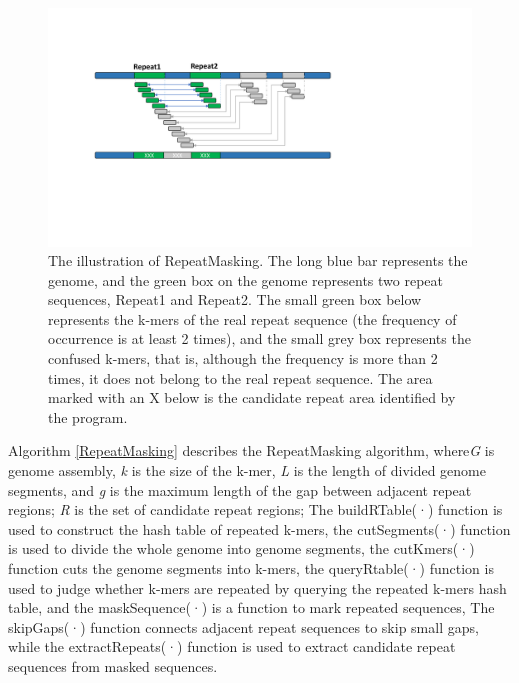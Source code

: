 \documentclass{bmcart}
\begin{document}
\begin{figure}[h!]
	\centerline{\includegraphics[width=1.0\textwidth]{figures/RepeatMasking.pdf}}
	\caption{The illustration of RepeatMasking. The long blue bar represents the genome, and the green box on the genome represents two repeat sequences, Repeat1 and Repeat2. The small green box below represents the k-mers of the real repeat sequence (the frequency of occurrence is at least 2 times), and the small grey box represents the confused k-mers, that is, although the frequency is more than 2 times, it does not belong to the real repeat sequence. The area marked with an X below is the candidate repeat area identified by the program.}
	\label{fig:repeatmasking}
\end{figure}

Algorithm \ref{RepeatMasking} describes the RepeatMasking algorithm, where\emph{G} is genome assembly, \emph{k} is the size of the k-mer, \emph{L} is the length of divided genome segments, and \emph{g} is the maximum length of the gap between adjacent repeat regions; \emph{R} is the set of candidate repeat regions; The buildRTable(·) function is used to construct the hash table of repeated k-mers, the cutSegments(·) function is used to divide the whole genome into genome segments, the cutKmers(·) function cuts the genome segments into k-mers, the queryRtable(·) function is used to judge whether k-mers are repeated by querying the repeated k-mers hash table, and the maskSequence(·) is a function to mark repeated sequences, The skipGaps(·) function connects adjacent repeat sequences to skip small gaps, while the extractRepeats(·) function is used to extract candidate repeat sequences from masked sequences.
\end{document}
